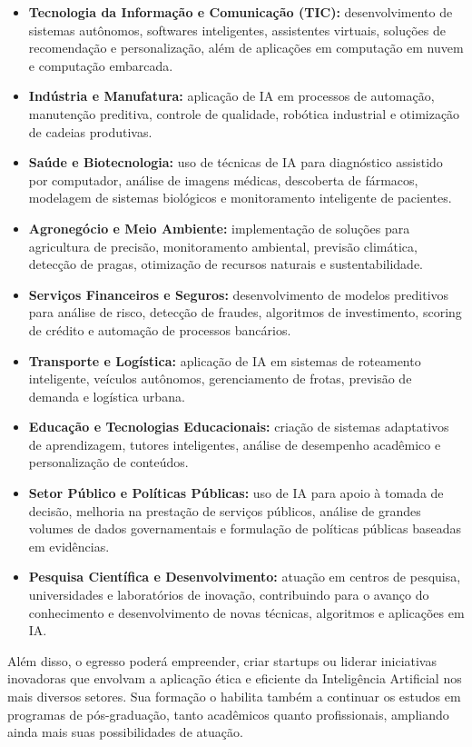 \begin{itemize}
    \item \textbf{Tecnologia da Informação e Comunicação (TIC):} desenvolvimento de sistemas autônomos, softwares inteligentes, assistentes virtuais, soluções de recomendação e personalização, além de aplicações em computação em nuvem e computação embarcada.

    \item \textbf{Indústria e Manufatura:} aplicação de IA em processos de automação, manutenção preditiva, controle de qualidade, robótica industrial e otimização de cadeias produtivas.
    
    \item \textbf{Saúde e Biotecnologia:} uso de técnicas de IA para diagnóstico assistido por computador, análise de imagens médicas, descoberta de fármacos, modelagem de sistemas biológicos e monitoramento inteligente de pacientes.
    
    \item \textbf{Agronegócio e Meio Ambiente:} implementação de soluções para agricultura de precisão, monitoramento ambiental, previsão climática, detecção de pragas, otimização de recursos naturais e sustentabilidade.
    
    \item \textbf{Serviços Financeiros e Seguros:} desenvolvimento de modelos preditivos para análise de risco, detecção de fraudes, algoritmos de investimento, scoring de crédito e automação de processos bancários.
    
    \item \textbf{Transporte e Logística:} aplicação de IA em sistemas de roteamento inteligente, veículos autônomos, gerenciamento de frotas, previsão de demanda e logística urbana.
    
    \item \textbf{Educação e Tecnologias Educacionais:} criação de sistemas adaptativos de aprendizagem, tutores inteligentes, análise de desempenho acadêmico e personalização de conteúdos.
    
    \item \textbf{Setor Público e Políticas Públicas:} uso de IA para apoio à tomada de decisão, melhoria na prestação de serviços públicos, análise de grandes volumes de dados governamentais e formulação de políticas públicas baseadas em evidências.
    
    \item \textbf{Pesquisa Científica e Desenvolvimento:} atuação em centros de pesquisa, universidades e laboratórios de inovação, contribuindo para o avanço do conhecimento e desenvolvimento de novas técnicas, algoritmos e aplicações em IA.
\end{itemize}

Além disso, o egresso poderá empreender, criar startups ou liderar iniciativas inovadoras que envolvam a aplicação ética e eficiente da Inteligência Artificial nos mais diversos setores. Sua formação o habilita também a continuar os estudos em programas de pós-graduação, tanto acadêmicos quanto profissionais, ampliando ainda mais suas possibilidades de atuação.

